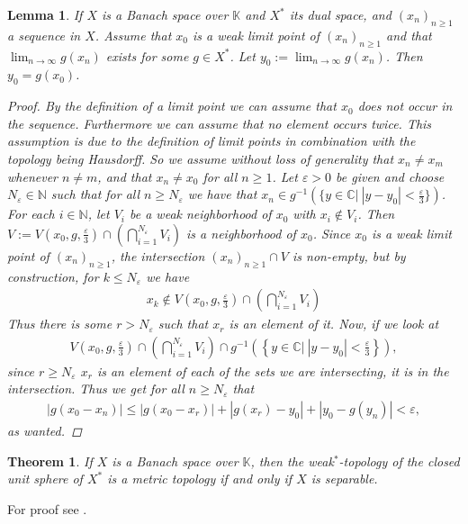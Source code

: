 \documentclass[10pt,twoside,openany,final]{memoir}
\theoremstyle{break}
\newtheorem{theorem}[section]{Theorem}
\newtheorem{lemma}[section]{Lemma}
\theoremstyle{Break}
\newcommand{\C}{\mathbb{C}}
\newcommand{\N}{\mathbb{N}}
\begin{document}
\begin{lemma}\label{lma:1.5}
If $X$ is a Banach space over $\mathbb{K}$ and $X^*$ its dual space, and $(x_{n})_{n\geq 1}$ a sequence in $X$.
Assume that $x_{0}$ is a weak limit point of $(x_{n})_{n\geq 1}$ and that $\lim_{n \to \infty} g(x_{n})$ exists for some $g \in X^*$. Let $y_0:=\lim_{n \to \infty} g(x_{n})$. Then $y_0 = g(x_{0})$.
\begin{proof}
By the definition of a limit point we can assume that $x_0$ does not occur in the sequence.
Furthermore we can assume that no element occurs twice.
This assumption is due to the definition of limit points in combination with the topology being Hausdorff.
So we assume without loss of generality that $x_n \neq x_m$ whenever $n\neq m$, and that $x_n\neq x_0$ for all $n\geq 1$.
Let $\varepsilon>0$ be given and choose $N_{\varepsilon} \in \N$ such that for all $n \geq N_{\varepsilon}$ we have that $ x_{n} \in g^{-1} (\{ y \in \C \big|\ |y - y_0| < \frac{\varepsilon}{3}\})$.
For each $i \in \N$, let $V_{i}$ be a weak neighborhood of $x_{0}$ with $x_{i} \not\in V_{i}$.
Then $V:=V\left(x_{0},g,\frac{\varepsilon}{3}\right) \cap \left(\bigcap_{i=1}^{N_{\varepsilon}} V_{i}\right)$ is a neighborhood of $x_{0}$. Since $x_{0}$ is a weak limit point of $(x_{n})_{n \geq 1}$, the intersection $(x_{n})_{n \geq 1} \cap V$ is non-empty, but by construction, for $k \leq N_{\varepsilon}$ we have
\begin{align*}
x_{k} \not\in V\left(x_{0},g,\frac{\varepsilon}{3}\right) \cap \left(\bigcap_{i=1}^{N_{\varepsilon}} V_{i}\right)
\end{align*}
Thus there is some $r > N_{\varepsilon}$ such that $x_{r}$ is an element of it. Now, if we look at 
\begin{align*}
V\left(x_{0},g,\frac{\varepsilon}{3}\right) \cap \left(\bigcap_{i=1}^{N_{\varepsilon}} V_{i}\right) \cap g^{-1} \left(\left\{ y \in \C \big|\ |y - y_0| < \frac{\varepsilon}{3}\right\}\right),
\end{align*}
since $r \geq N_{\varepsilon}$ $x_{r}$ is an element of each of the sets we are intersecting, it is in the intersection.
Thus we get for all $n \geq N_{\varepsilon}$ that
\begin{align*}
|g(x_{0}-x_{n})| \leq |g(x_{0} - x_{r})| + |g(x_{r})-y_{0}| + |y_{0}-g(y_{n})| < \varepsilon,
\end{align*}
as wanted.
\end{proof}
\end{lemma}

\begin{theorem}\label{thm:metriciffsep}
If $X$ is a Banach space over $\mathbb{K}$, then the weak$^*$-topology of the closed unit sphere of $X^*$ is a metric topology if and only if $X$ is separable.
\end{theorem}
\noindent For proof see \cite[Theorem 5.1][138]{conway2013course}.
\end{document}
